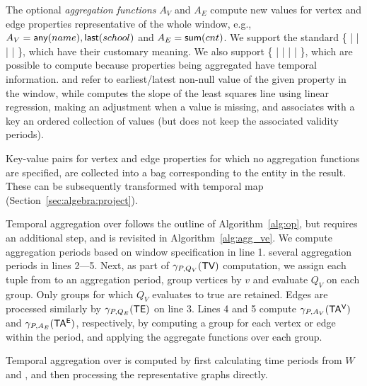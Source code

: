 The optional {\em aggregation functions} $A_V$ and $A_E$ compute new
values for vertex and edge properties representative of
the whole window, e.g., $A_V=\textsf{any}(name), \textsf{last}(school)$
and $A_E=\textsf{sum}(cnt)$.
%
We support the standard \{  |  |  |
 |  \}, which have their customary meaning.
We also support \{  |  |  |
 |  \}, which are possible to compute because
properties being aggregated have temporal information.  
and  refer to earliest/latest non-null value of the given
property in the window, while  computes the slope of the
least squares line using linear regression, making an adjustment when
a value is missing, and  associates with a key an ordered
collection of values (but does not keep the associated validity
periods).
 
Key-value pairs for vertex and edge properties for which no aggregation
functions are specified, are collected into a bag corresponding to the
entity in the result.  These can be subsequently transformed with
temporal map (Section~\ref{sec:algebra:project}).
 
Temporal aggregation over \tve follows the outline of
Algorithm~\ref{alg:op}, but requires an additional step, and is
revisited in Algorithm~\ref{alg:agg_ve}.
%
We compute aggregation periods based on window specification in line
1.  several aggregation periods in lines 2---5.  Next, as part of
$\gamma_{P,Q_V}(\textsf{TV})$ computation, we assign each tuple from \tv to an
aggregation period, group vertices by $v$ and evaluate $Q_V$ on each
group.  Only groups for which $Q_V$ evaluates to true are retained.
Edges are processed similarly by $\gamma_{P,Q_E}(\textsf{TE})$ on line 3.
Lines 4 and 5 compute $\gamma_{P,A_V}(\mathsf{TA^{V}})$ and
$\gamma_{P,A_E}(\mathsf{TA^{E}})$, respectively, by computing a group for each
vertex or edge within the period, and applying the aggregate functions
over each group. 

Temporal aggregation over \trg is computed by first calculating time
periods from $W$ and \trg, and then processing the representative
graphs directly.  

